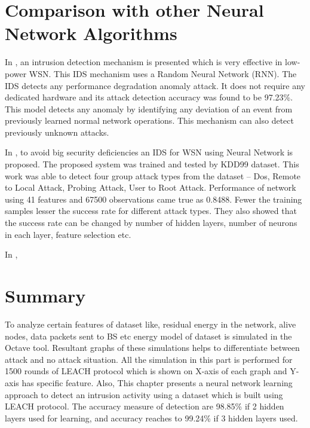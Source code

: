\section{Comparison with other Neural Network Algorithms}
In \cite{saeed2016random}, an intrusion detection mechanism is presented which is very effective in low-power WSN. This IDS mechanism uses a Random Neural Network (RNN). The IDS detects any performance degradation anomaly attack. It does not require any dedicated hardware and its attack detection accuracy was found to be 97.23\%. This model detects any anomaly by identifying any deviation of an event from previously learned normal network operations. This mechanism can also detect previously unknown attacks.
\par
In \cite{Turkish2015ANN}, to avoid big security deficiencies an IDS for WSN using Neural Network is proposed. The proposed system was trained and tested by KDD99 dataset. This work was able to detect four group attack types from the dataset – Dos, Remote to Local Attack, Probing Attack, User to Root Attack. Performance of network using 41 features and 67500 observations came true as 0.8488. Fewer the training samples lesser the success rate for different attack types. They also showed that the success rate can be changed by number of hidden layers, number of neurons in each layer, feature selection etc.
\par
In \cite{almomani2016wsn}, 

\section{Summary}
To analyze certain features of dataset like, residual energy in the network, alive nodes, data packets sent to BS etc energy model of dataset is simulated in the Octave tool. Resultant graphs of these simulations helps to differentiate between attack and no attack situation. All the simulation in this part is performed for 1500 rounds of LEACH protocol which is shown on X-axis of each graph and Y-axis has specific feature. Also, This chapter presents a neural network learning approach to detect an intrusion activity using a dataset which is built using LEACH protocol. The accuracy measure of detection are 98.85\% if 2 hidden layers used for learning, and accuracy reaches to 99.24\% if 3 hidden layers used.